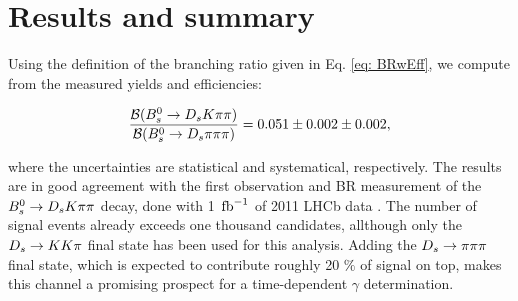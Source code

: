 \section{Results and summary}
\label{sec: results}

Using the definition of the branching ratio given in Eq. \ref{eq: BRwEff}, we compute from the measured yields and efficiencies:

\begin{equation}
\frac{\mathcal{B}({{B}^0_{s}}\rightarrow{\ensuremath{{D}_{s}}}{\ensuremath{K}}{\ensuremath{\pi}}{\ensuremath{\pi}})}{\mathcal{B}({{B}^0_{s}}\rightarrow{\ensuremath{{D}_{s}}}{\ensuremath{\pi}}{\ensuremath{\pi}}{\ensuremath{\pi}})} = 0.051 \pm 0.002 \pm 0.002,
\label{eq: resultBR}
\end{equation}

where the uncertainties are statistical and systematical, respectively. \newline
The results are in good agreement with the first observation and BR measurement of the ${{B}^0_{s}}\rightarrow{\ensuremath{{D}_{s}}}{\ensuremath{K}}{\ensuremath{\pi}}{\ensuremath{\pi}}$ decay, done with 1 $\mbox{\,fb}^{-1}$ of 2011 LHCb data \cite{Blusk:2012it}.  
The number of signal events already exceeds one thousand candidates, allthough only the ${{D}_{s}}\rightarrow{\ensuremath{K}}{\ensuremath{K}}{\ensuremath{\pi}}$ final state has been used for this analysis. 
Adding the ${{D}_{s}}\rightarrow{\ensuremath{\pi}}{\ensuremath{\pi}}{\ensuremath{\pi}}$ final state, which is expected to contribute roughly 20 $\%$ of signal on top, makes this channel a promising prospect for a time-dependent $\gamma$ determination.

